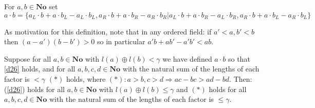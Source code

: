 \begin{definition} \label{d26}%
For $a,b\in \mathbf{No}$ set
\[
a\cdot b = \{a_L\cdot b + a\cdot b_L - a_L\cdot b_L, a_R\cdot b + a\cdot b_R - a_R\cdot b_R | a_L\cdot b + a\cdot b_R - a_L\cdot b_R, a_R\cdot b + a\cdot b_L - a_R\cdot b_L \}
\]
\end{definition}

As motivation for this definition, note that in any ordered field: if $a'<a,b'<b$ then $(a-a')(b-b')>0$ so in particular $a'b + ab' - a'b' < ab$.

\begin{lemma} \label{l27} %
Suppose for all $a,b\in \mathbf{No}$ with $l(a)\oplus l(b) < \gamma$ we have defined $a\cdot b$ so that \eqref{d26} holds, and for all $a,b,c,d\in \mathbf{No}$ with the natural sum of the lengths of each factor is $<\gamma$ $(*)$ holds, where
$(*): a>b, c>d \Rightarrow ac-bc > ad-bd.$
Then: (\ref{d26}) holds for all $a,b\in \mathbf{No}$ with $l(a)\oplus l(b) \leq \gamma$ and $(*)$ holds for all $a,b,c,d\in \mathbf{No}$ with the natural sum of the lengths of each factor is $\leq \gamma$.
 \end{lemma}

